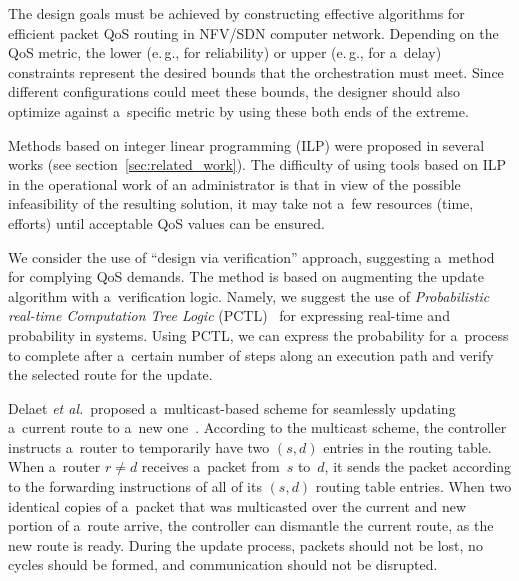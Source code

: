 \begin{multicols}{2}
The design goals must be achieved by constructing effective algorithms for 
efficient packet QoS routing in NFV/SDN computer network. Depending on the 
QoS metric, the lower (e.\,g., for reliability) or upper (e.\,g., for a~delay) 
constraints represent the desired bounds that the orchestration must meet. 
Since different configurations could meet these bounds, the designer should also 
optimize against a~specific metric by using these both ends of the extreme. 

Methods based on integer linear programming (ILP) were proposed in several works 
(see section~\ref{sec:related_work}). The difficulty of using tools based on ILP 
 in the operational work of an administrator is that in view of the possible 
 infeasibility of the resulting solution, it may take not a~few resources (time, efforts) 
 until acceptable QoS values can be ensured.

We consider the use of ``design via verification'' approach, suggesting a~method 
for complying QoS demands. The method is based on augmenting the update algorithm with
a~verification logic. Namely, we suggest the use of 
\textit{Probabilistic real-time Computation Tree Logic} 
(PCTL)~\cite{hansson_logic_1994} for expressing real-time and probability in systems. 
Using PCTL, we can express the probability for a~process to complete after 
a~certain number of steps along an execution path and verify the selected route 
for the update.


Delaet \textit{et al.}\ proposed a~multicast-based scheme for seamlessly updating 
a~current route to a~new one~\cite{delaet_seamless_2015}. 
According to the multicast scheme, the controller instructs 
a~router to temporarily have two $(s,d)$ entries in the routing table. When 
a~router $r \neq d$ receives a~packet from~$s$ to~$d$, it sends the packet 
according to the forwarding instructions of all of its $(s,d)$ routing 
table entries. When two identical copies of a~packet that was multicasted 
over the current and new portion of a~route arrive, the controller can dismantle 
the current route, as the new route is ready. During the update process, packets 
should not be lost, no cycles should be formed, and communication should not 
be disrupted.



\end{multicols}
